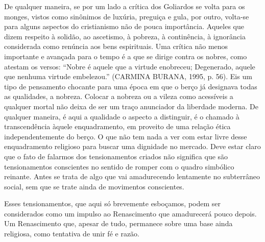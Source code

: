 De qualquer maneira, se por um lado a crítica dos Goliardos se volta
para os monges, vistos como sinônimos de luxúria, preguiça e gula, por
outro, volta-se para alguns aspectos do cristianismo não de pouca
importância. Aqueles que dizem respeito à solidão, ao ascetismo, à
pobreza, à continência, à ignorância considerada como renúncia aos bens
espirituais. Uma crítica não menos importante e avançada para o tempo é
a que se dirige contra os nobres, como atestam os versos: ``Nobre é
aquele que a virtude enobreceu; Degenerado, aquele que nenhuma virtude
embelezou.'' (CARMINA BURANA, 1995, p. 56). Eis um tipo de pensamento
chocante para uma época em que o berço já designava todas as qualidades,
a nobreza. Colocar a nobreza ou a vileza como acessíveis a qualquer
mortal não deixa de ser um traço anunciador da liberdade moderna. De
qualquer maneira, é aqui a qualidade o aspecto a distinguir, é o chamado
à transcendência àquele enquadramento, em proveito de uma relação ética
independentemente do berço. O que não tem nada a ver com estar livre
desse enquadramento religioso para buscar uma dignidade no mercado. Deve
estar claro que o fato de falarmos dos tensionamentos criados não
significa que são tensionamentos conscientes no sentido de romper com o
quadro simbólico reinante. Antes se trata de algo que vai amadurecendo
lentamente no subterrâneo social, sem que se trate ainda de movimentos
conscientes.

Esses tensionamentos, que aqui só brevemente esboçamos, podem ser
considerados como um impulso ao Renascimento que amadurecerá pouco
depois. Um Renascimento que, apesar de tudo, permanece sobre uma base
ainda religiosa, como tentativa de unir fé e razão.

